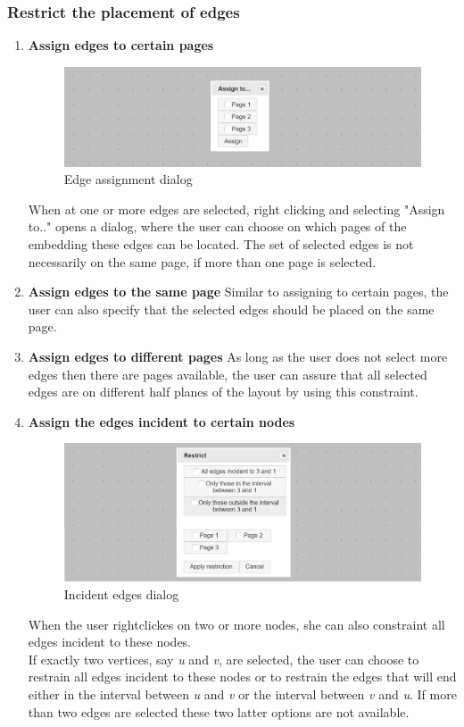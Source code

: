 \subsubsection{Restrict the placement of edges}
\begin{enumerate}
\item \textbf{Assign edges to certain pages} 
\begin{figure}
\begin{center}
\includegraphics[width=\textwidth]{figures/figIndex/Assign.jpg}
\caption{Edge assignment dialog}
\end{center}
\end{figure}
When at one or more edges are selected, right clicking and selecting "Assign to.." opens a dialog, where the user can choose on which pages of the embedding these edges can be located. The set of selected edges is not necessarily on the same page, if more than one page is selected.  
\item \textbf{Assign edges to the same page} Similar to assigning to certain pages, the user can also specify that the selected edges should be placed on the same page. 
\item \textbf{Assign edges to different pages}
As long as the user does not select more edges then there are pages available, the user can assure that all selected edges are on different half planes of the layout by using this constraint.
\item \textbf{Assign the edges incident to certain nodes}
\begin{figure}
\includegraphics[width=\textwidth]{figures/figIndex/AssignAdj.jpg}
\caption{Incident edges dialog}
\end{figure}
When the user rightclickes on two or more nodes, she can also constraint all edges incident to these nodes.\\
If exactly two vertices, say \textit{u} and \textit{v}, are selected, the user can choose to restrain all edges incident to these nodes or to restrain the edges that will end either in the interval between \textit{u} and \textit{v} or the interval between \textit{v} and \textit{u}. If more than two edges are selected these two latter options are not available.\\
\end{enumerate}
